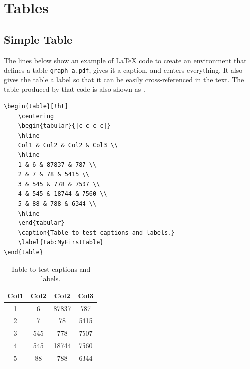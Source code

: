 \section{Tables}
\label{sec:Tables}

\subsection{Simple Table}
\label{sec:SimpleTable}

The lines below show an example of \LaTeX{} code to create an environment that defines a table \verb|graph_a.pdf|, gives it a caption, and centers everything.
It also gives the table a label so that it can be easily cross-referenced in the text. The table produced by that code is also shown as .

\begin{verbatim}
\begin{table}[!ht]
    \centering
    \begin{tabular}{|c c c c|} 
    \hline
    Col1 & Col2 & Col2 & Col3 \\
    \hline
    1 & 6 & 87837 & 787 \\ 
    2 & 7 & 78 & 5415 \\
    3 & 545 & 778 & 7507 \\
    4 & 545 & 18744 & 7560 \\
    5 & 88 & 788 & 6344 \\
    \hline
    \end{tabular}
    \caption{Table to test captions and labels.}
    \label{tab:MyFirstTable}
\end{table}
\end{verbatim}

\begin{table}[!ht]
    \centering
    \begin{tabular}{|c c c c|} 
    \hline
    Col1 & Col2 & Col2 & Col3 \\
    \hline
    1 & 6 & 87837 & 787 \\ 
    2 & 7 & 78 & 5415 \\
    3 & 545 & 778 & 7507 \\
    4 & 545 & 18744 & 7560 \\
    5 & 88 & 788 & 6344 \\
    \hline
    \end{tabular}
    \caption{Table to test captions and labels.}
    \label{tab:MyFirstTable}
\end{table}

